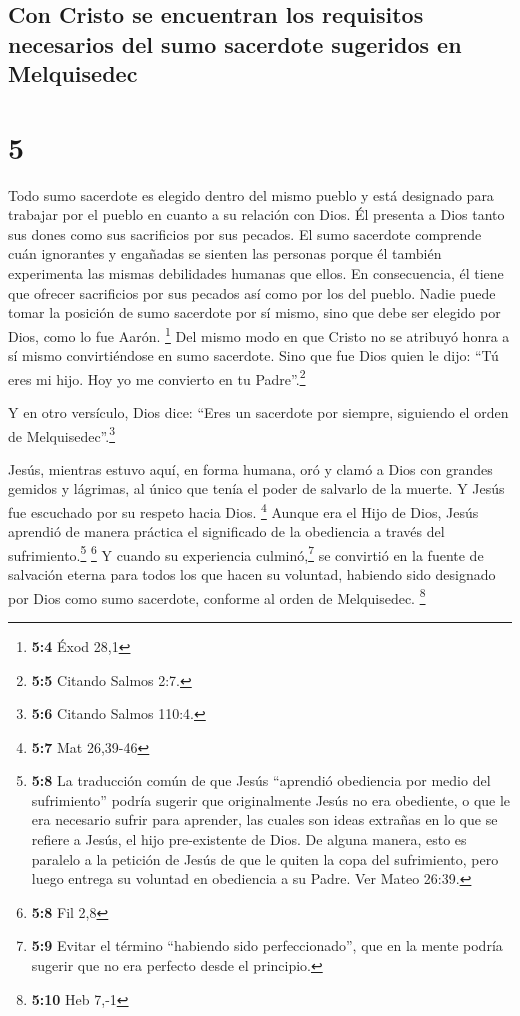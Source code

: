 \hypertarget{con-cristo-se-encuentran-los-requisitos-necesarios-del-sumo-sacerdote-sugeridos-en-melquisedec}{%
\subsection{Con Cristo se encuentran los requisitos necesarios del sumo
sacerdote sugeridos en
Melquisedec}\label{con-cristo-se-encuentran-los-requisitos-necesarios-del-sumo-sacerdote-sugeridos-en-melquisedec}}

\hypertarget{section-4}{%
\section{5}\label{section-4}}

 Todo sumo sacerdote es elegido dentro del mismo pueblo y
está designado para trabajar por el pueblo en cuanto a su relación con
Dios. Él presenta a Dios tanto sus dones como sus sacrificios por sus
pecados.  El sumo sacerdote comprende cuán ignorantes y
engañadas se sienten las personas porque él también experimenta las
mismas debilidades humanas que ellos.  En consecuencia, él
tiene que ofrecer sacrificios por sus pecados así como por los del
pueblo.  Nadie puede tomar la posición de sumo sacerdote
por sí mismo, sino que debe ser elegido por Dios, como lo fue Aarón.
\footnote{\textbf{5:4} Éxod 28,1}  Del mismo modo en que
Cristo no se atribuyó honra a sí mismo convirtiéndose en sumo sacerdote.
Sino que fue Dios quien le dijo: ``Tú eres mi hijo. Hoy yo me convierto
en tu Padre''.\footnote{\textbf{5:5} Citando Salmos 2:7.}

 Y en otro versículo, Dios dice: ``Eres un sacerdote por
siempre, siguiendo el orden de Melquisedec''.\footnote{\textbf{5:6}
  Citando Salmos 110:4.}

 Jesús, mientras estuvo aquí, en forma humana, oró y clamó
a Dios con grandes gemidos y lágrimas, al único que tenía el poder de
salvarlo de la muerte. Y Jesús fue escuchado por su respeto hacia Dios.
\footnote{\textbf{5:7} Mat 26,39-46}  Aunque era el Hijo
de Dios, Jesús aprendió de manera práctica el significado de la
obediencia a través del sufrimiento.\footnote{\textbf{5:8} La traducción
  común de que Jesús ``aprendió obediencia por medio del sufrimiento''
  podría sugerir que originalmente Jesús no era obediente, o que le era
  necesario sufrir para aprender, las cuales son ideas extrañas en lo
  que se refiere a Jesús, el hijo pre-existente de Dios. De alguna
  manera, esto es paralelo a la petición de Jesús de que le quiten la
  copa del sufrimiento, pero luego entrega su voluntad en obediencia a
  su Padre. Ver Mateo 26:39.} \footnote{\textbf{5:8} Fil 2,8}
 Y cuando su experiencia culminó,\footnote{\textbf{5:9}
  Evitar el término ``habiendo sido perfeccionado'', que en la mente
  podría sugerir que no era perfecto desde el principio.} se convirtió
en la fuente de salvación eterna para todos los que hacen su voluntad,
 habiendo sido designado por Dios como sumo sacerdote,
conforme al orden de Melquisedec. \footnote{\textbf{5:10} Heb 7,-1}

